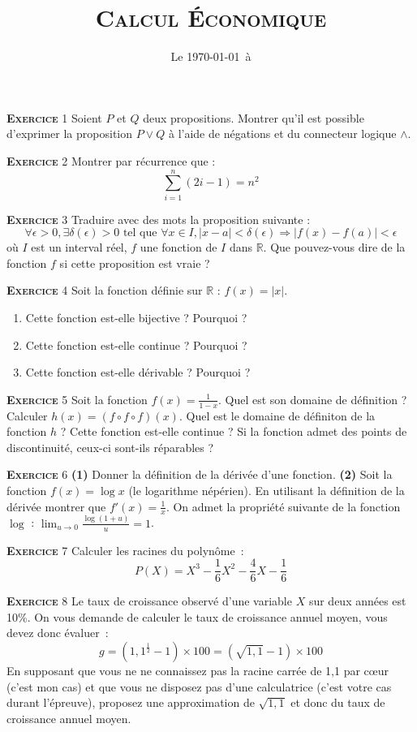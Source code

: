 \documentclass[10pt,a4paper]{article}
\newcommand{\exercice}[1]{\textsc{\textbf{Exercice}} #1}
\begin{document}
\title{\textsc{Calcul Économique}}
\date{Le \today\ à \thistime}

\maketitle

\exercice{1} Soient $P$ et $Q$ deux propositions. Montrer qu'il est possible
d'exprimer la proposition $P\lor Q$ à l'aide de négations et du connecteur
logique $\land$.

\bigskip

\exercice{2} Montrer par récurrence que :
\[
\sum_{i=1}^n (2i-1) = n^2
\]
	
\bigskip

\exercice{3} Traduire avec des mots la proposition suivante :
\[
\forall \epsilon>0, \exists \delta(\epsilon)>0\text{ tel que } \forall x \in I, |x-a|<\delta(\epsilon)\Rightarrow |f(x)-f(a)|<\epsilon
\]
où $I$ est un interval réel, $f$ une fonction de $I$ dans $\mathbb R$. Que
pouvez-vous dire de la fonction $f$ si cette proposition est vraie ?

\bigskip

\exercice{4} Soit la fonction définie sur $\mathbb R$ : $f(x) = |x|$.
\begin{enumerate}
\item Cette fonction est-elle bijective ? Pourquoi ?
\item Cette fonction est-elle continue ? Pourquoi ?
\item Cette fonction est-elle dérivable ? Pourquoi ? 
\end{enumerate}
	
\bigskip

\exercice{5} Soit la fonction $f(x) = \frac{1}{1-x}$. Quel est son domaine de définition ? Calculer
$h(x)=\left(f\circ f\circ f \right)(x)$. Quel est le domaine de définiton de la
fonction $h$ ? Cette fonction est-elle continue ? Si la fonction admet des points
de discontinuité, ceux-ci sont-ils réparables ?

\bigskip

\exercice{6} \textbf{(1)} Donner la définition de la dérivée d'une fonction.
\textbf{(2)} Soit la fonction $f(x) = \log x$ (le logarithme népérien). En
utilisant la définition de la dérivée montrer que
$f'(x)=\frac{1}{x}$. On admet la propriété suivante de la fonction
  $\log$ : $\lim_{u\rightarrow 0} \frac{\log(1+u)}{u}=1$.

\pagebreak

\exercice{7} Calculer les racines du polynôme :
\[
P(X) = X^3 - \frac{1}{6}X^2 - \frac{4}{6}X - \frac{1}{6}
\]    

\bigskip

\exercice{8} Le taux de croissance observé d'une variable $X$ sur deux années
est 10\%. On vous demande de calculer le taux de croissance annuel moyen, vous
devez donc évaluer :
\[
g = (1,1^{\frac{1}{2}}-1)\times 100 = \left(\sqrt{1,1}-1\right)\times 100
\]
En supposant que vous ne ne connaissez pas la racine carrée de 1,1 par c\oe ur
(c'est mon cas) et que vous ne disposez pas d'une calculatrice (c'est votre cas
durant l'épreuve), proposez une approximation de $\sqrt{1,1}$ et donc du taux de
croissance annuel moyen.
 
\end{document}
